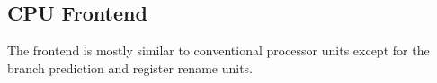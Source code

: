 \subsection{CPU Frontend}
\label{sec:cpu_frontend}

The frontend is mostly similar to conventional processor units except for the
branch prediction and register rename units.





% 
